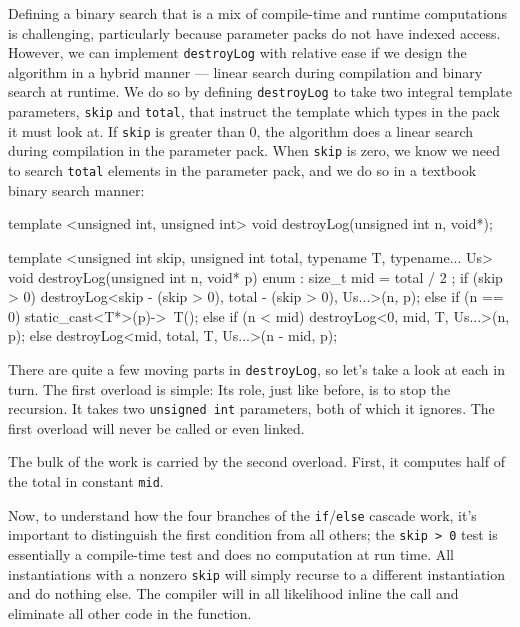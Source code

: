 Defining a binary search that is a mix of compile-time and runtime
computations is challenging, particularly because parameter packs do not
have indexed access. However, we can implement \lstinline!destroyLog! with
relative ease if we design the algorithm in a hybrid manner --- linear
search during compilation and binary search at runtime. We do so by
defining \lstinline!destroyLog! to take two integral template parameters,
\lstinline!skip! and \lstinline!total!, that instruct the template which types
in the pack it must look at. If \lstinline!skip! is greater than 0, the
algorithm does a linear search during compilation in the parameter pack.
When \lstinline!skip! is zero, we know we need to search \lstinline!total!
elements in the parameter pack, and we do so in a textbook binary search
manner:

\begin{emcppslisting}
template <unsigned int, unsigned int>
void destroyLog(unsigned int n, void*);

template <unsigned int skip, unsigned int total, typename T, typename... Us>
void destroyLog(unsigned int n, void* p)
{
    enum : size_t { mid = total / 2 };
    if (skip > 0)
        destroyLog<skip - (skip > 0), total - (skip > 0), Us...>(n, p);
    else if (n == 0)
        static_cast<T*>(p)->~T();
    else if (n < mid)
        destroyLog<0, mid, T, Us...>(n, p);
    else
        destroyLog<mid, total, T, Us...>(n - mid, p);
}
\end{emcppslisting}
    

\noindent There are quite a few moving parts in \lstinline!destroyLog!, so let's take
a look at each in turn. The first overload is simple: Its role, just
like before, is to stop the recursion. It takes two
\lstinline!unsigned!~\lstinline!int! parameters, both of which it ignores. The
first overload will never be called or even linked.

The bulk of the work is carried by the second overload. First, it
computes half of the total in constant \lstinline!mid!.

Now, to understand how the four branches of the
\lstinline!if!/\lstinline!else! cascade work, it's important to distinguish
the first condition from all others; the
\lstinline!skip!~\lstinline!>!~\lstinline!0! test is essentially a compile-time
test and does no computation at run time. All instantiations with a
nonzero \lstinline!skip! will simply recurse to a different instantiation
and do nothing else. The compiler will in all likelihood inline the call
and eliminate all other code in the function.

